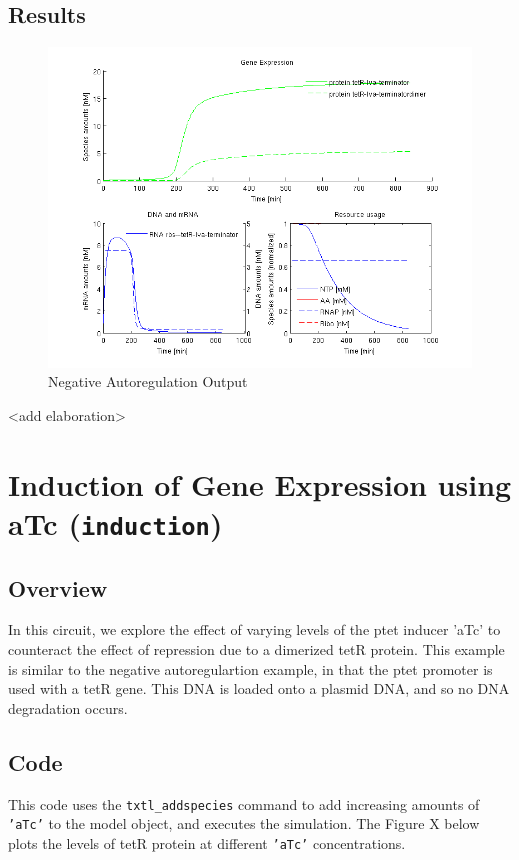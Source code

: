 \documentclass[english]{report}
\begin{document}
		
		\subsection{Results}	
		
		\begin{figure}
		\begin{center}
		\includegraphics[width=\textwidth]{negauto_1nM_toolbox.png} 
		\caption{Negative Autoregulation Output}
		\label{fig:negautoreg}
		\end{center}
		
		\end{figure}
		{\color{red} <add elaboration>}
		
	\section{Induction of Gene Expression using aTc (\texttt{induction})}
		\subsection{Overview}
		In this circuit, we explore the effect of varying levels of the ptet inducer 'aTc' to counteract the effect of repression due to a dimerized tetR protein. This example is similar to the negative autoregulartion example, in that the ptet promoter is used with a tetR gene. This DNA is loaded onto a plasmid DNA, and so no DNA degradation occurs. 
		 
		\subsection{Code}
		This code uses the \texttt{txtl\_addspecies} command to add increasing amounts of \texttt{'aTc'} to the model object, and executes the simulation. The Figure X below plots the levels of tetR protein at different \texttt{'aTc'} concentrations. \\
		
\end{document}
